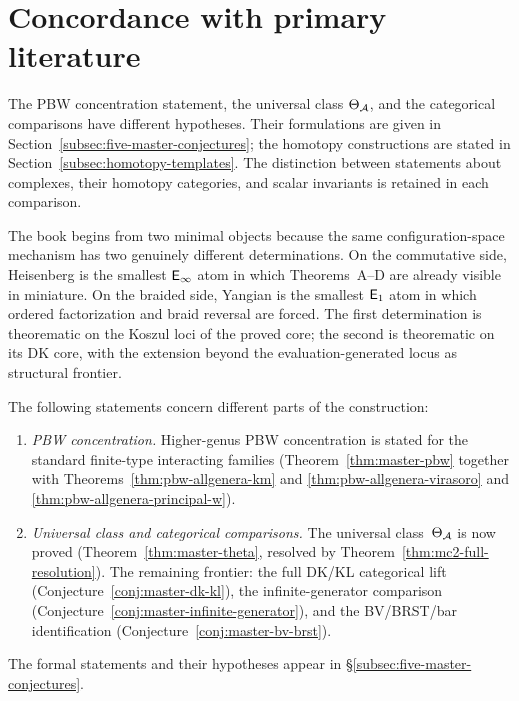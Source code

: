 \chapter{Concordance with primary literature}
\label{chap:concordance}


\begin{remark}\label{rem:constitutional}
The PBW concentration statement, the universal class $\Theta_{\mathcal{A}}$, and the
categorical comparisons have different hypotheses.
Their formulations are given in Section~\ref{subsec:five-master-conjectures};
the homotopy constructions are stated in Section~\ref{subsec:homotopy-templates}.
The distinction between statements about complexes, their homotopy categories,
and scalar invariants is retained in each comparison.
\end{remark}

The book begins from two minimal objects because the same
configuration-space mechanism has two genuinely different
determinations.  On the commutative side, Heisenberg is the smallest
$\mathsf{E}_{\infty}$ atom in which Theorems~A--D are already visible in miniature.
On the braided side, Yangian is the smallest $\mathsf{E}_1$ atom in which
ordered factorization and braid reversal are forced.  The first
determination is theorematic on the Koszul loci of the proved core; the
second is theorematic on its DK core, with the extension beyond the
evaluation-generated locus as structural frontier.

\begin{remark}
The following statements concern different parts of the construction:
\begin{enumerate}[label=\textup{(\roman*)}]
\item \emph{PBW concentration.}  Higher-genus PBW concentration is
  stated for the standard finite-type interacting families
  (Theorem~\ref{thm:master-pbw} together with
  Theorems~\ref{thm:pbw-allgenera-km} and
  \ref{thm:pbw-allgenera-virasoro} and
  \ref{thm:pbw-allgenera-principal-w}).
\item \emph{Universal class and categorical comparisons.}
  The universal class~$\Theta_{\mathcal{A}}$ is now proved
  (Theorem~\ref{thm:master-theta}, resolved by
  Theorem~\ref{thm:mc2-full-resolution}).  The remaining frontier:
  the full DK/KL categorical lift
  (Conjecture~\ref{conj:master-dk-kl}), the infinite-generator
  comparison (Conjecture~\ref{conj:master-infinite-generator}),
  and the BV/BRST/bar identification
  (Conjecture~\ref{conj:master-bv-brst}).
\end{enumerate}
The formal statements and their hypotheses appear in
\S\ref{subsec:five-master-conjectures}.
\end{remark}

